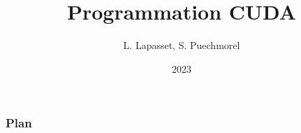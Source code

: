 \documentclass[handout]{beamer}
\title{Programmation CUDA}
\author{L. Lapasset, S. Puechmorel}
\date{2023}
\begin{document}
\begin{frame}
    \titlepage

\end{frame}
\begin{frame}
    \frametitle{Plan}
\tableofcontents
\end{frame}





\end{document}
